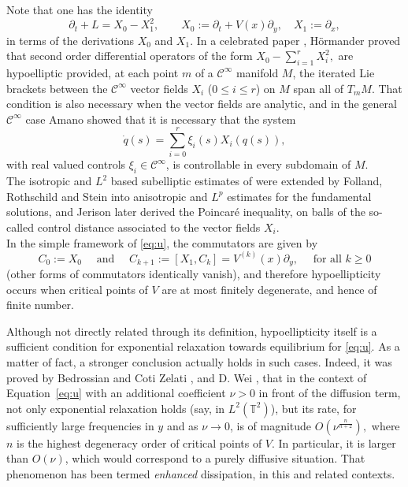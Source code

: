 \documentclass[12pt]{article}
\newcommand{\T}{\mathbb{T}}
\begin{document}
Note that one has the identity 
\begin{equation*}\label{eq:hor}
	\partial_t + L = X_0 - X_1^2, \qquad X_0 := \partial_t +
	V(x)\partial_y, \quad X_1 := \partial_x,    
\end{equation*}
in terms of the derivations $X_0$ and $X_1.$ In a celebrated paper \cite{Hor67}, 
H\"ormander proved that second order differential operators of the form 
$
X_0 - \sum_{i=1}^r X_i^2,
$
are hypoelliptic provided, at each point $m$ of a $\mathcal{C}^\infty$ manifold 
$M$, the iterated Lie brackets between the $\mathcal{C}^\infty$ vector 
fields $X_i$ ($0\leq i \leq r$) on $M$ span all of $T_mM$. That 
condition is also necessary when the vector fields are analytic, and in 
the general $\mathcal{C}^\infty$ case Amano \cite{Ama79} showed that it 
is necessary that the system
\begin{equation}\label{eq:controlsys}
	\dot q(s) = \sum_{i = 0}^r \xi_i(s) X_i(q(s)),
\end{equation}
with real valued controls $\xi_i \in \mathcal{C}^\infty$, is
controllable in every subdomain of $M.$\\
The isotropic and $L^2$
based subelliptic estimates of \cite{Hor67} were extended by Folland, 
Rothschild and Stein \cite{FolSte74, Fol75, RotSte76} into anisotropic 
and $L^p$ estimates for the fundamental solutions, and Jerison \cite{Jer86} 
later derived the Poincaré inequality, on balls of the so-called 
control distance associated to the vector fields $X_i.$\\
In the simple framework of \eqref{eq:u}, the commutators are given by
$$
C_0 := X_0 \quad\text{ and } \quad C_{k+1} := [X_1, C_{k}] = V^{(k)}(x)\partial_y,
\quad\text{ for all } k \geq 0
$$ 
(other forms of commutators identically vanish), and therefore 
hypoellipticity occurs when critical points of $V$ are at 
most finitely degenerate, and hence of finite number. 

\smallskip

Although not directly related through its definition, hypoellipticity itself 
is a sufficient condition for exponential relaxation towards 
equilibrium for \eqref{eq:u}. 
As a matter of fact, a stronger conclusion actually holds in such cases. 
Indeed, it was proved by Bedrossian and Coti Zelati 
\cite{BedCot17}, and D. Wei \cite{Wei21}, that in the context of 
Equation~\eqref{eq:u} with an additional coefficient $\nu > 0$ in front 
of the diffusion term, not only exponential relaxation holds (say, in
$L^2(\T^2)$), but 
its rate, for sufficiently large frequencies 
in $y$ and as $\nu \to 0$, is of magnitude $O(\nu^\frac{n}{n+2}),$ 
where $n$ is the highest degeneracy order of critical points of $V$. 
In particular, it is larger than $O(\nu)$, which would correspond to 
a purely diffusive situation. That phenomenon has been termed {\it enhanced} 
dissipation, in this and related contexts. 
\end{document}
